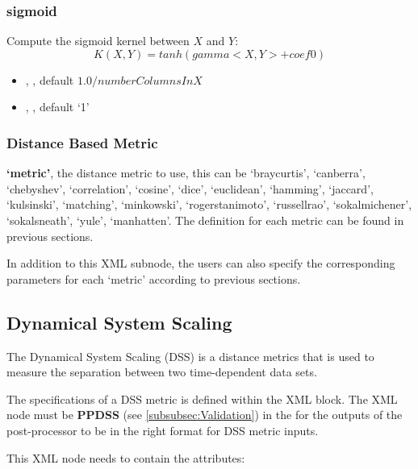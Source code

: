 \subsubsection{sigmoid}
Compute the sigmoid kernel between $X$ and $Y$:
\begin{equation}
  K(X, Y) = tanh(gamma <X, Y> + coef0)
\end{equation}
\begin{itemize}
  \item {}, , default $1.0/numberColumnsInX$
  \item {}, , default `1'
\end{itemize}

\subsubsection{Distance Based Metric}


\nb \textbf{`metric'}, the distance metric to use, this can be `braycurtis', `canberra', `chebyshev', `correlation',
`cosine', `dice', `euclidean', `hamming', `jaccard', `kulsinski', `matching', `minkowski', `rogerstanimoto',
`russellrao', `sokalmichener', `sokalsneath', `yule', `manhatten'. The definition for each metric can be found
in previous sections.

In addition to this XML subnode, the users can also specify the corresponding parameters for each `metric' according to
previous sections.

\subsection{Dynamical System Scaling}
\label{subsection:DSS}
The Dynamical System Scaling (DSS) is a distance metrics that is used to measure the separation
between two time-dependent data sets.

The specifications of a DSS metric is defined within the  XML block. The XML node  must be \textbf{PPDSS} (see \ref{subsubsec:Validation}) in the  for the outputs of the post-processor to be in the right format for DSS metric inputs.

This XML node needs to contain the attributes:

